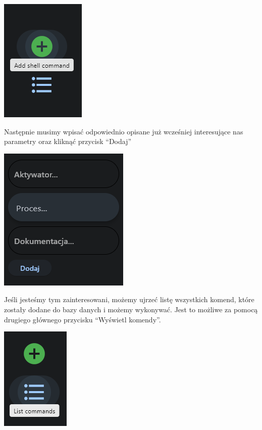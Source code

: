 \documentclass[polish]{article}
\begin{document}
        \begin{center}

          \includegraphics[scale=1.0]{screen2.png}

        \end{center}

        Następnie musimy wpisać odpowiednio opisane już wcześniej interesujące nas parametry oraz kliknąć przycisk ``Dodaj''

        \begin{center}

          \includegraphics[scale=1.0]{screen3.png}

        \end{center}

        Jeśli jesteśmy tym zainteresowani, możemy ujrzeć listę wszystkich komend, które zostały dodane do bazy danych i możemy wykonywać. Jest to możliwe za pomocą drugiego głównego przycisku ``Wyświetl komendy''.

        \begin{center}

          \includegraphics[scale=1.0]{screen4.png}

        \end{center}
\end{document}
